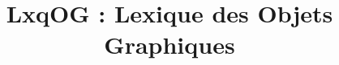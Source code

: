 

\usepackage{longtable}

\title{LxqOG : Lexique des Objets Graphiques}
\date{}


\maketitle

    


